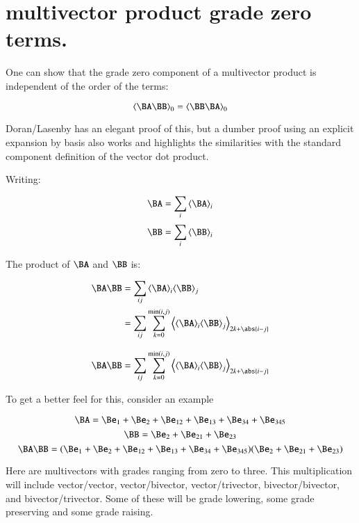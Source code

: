 
\chapter{ multivector product grade zero terms. }

One can show that the grade zero component of a multivector product 
is independent of the order of the terms:

\begin{equation}
\gpgradezero{\BA \BB} = \gpgradezero{\BB \BA}
\end{equation}

Doran/Lasenby has an elegant proof of this, but a dumber proof using an
explicit expansion by basis also works and highlights the similarities
with the standard component definition of the vector dot product.

Writing:

\[
\BA = \sum_i \gpgrade{\BA}{i}
\]
\[
\BB = \sum_i \gpgrade{\BB}{i}
\]

The product of $\BA$ and $\BB$ is:

\begin{align*}
\BA \BB 
&= \sum_{ij} \gpgrade{\BA}{i} \gpgrade{\BB}{j} \\
&= \sum_{ij} \sum_{k=0}^{\min(i,j)}\gpgrade{\gpgrade{\BA}{i} \gpgrade{\BB}{j}}{2k + \abs{i-j}} \\
\end{align*}

\begin{equation}\label{eqn:scalar_commutes:product}
\BA \BB 
= \sum_{ij} \sum_{k=0}^{\min(i,j)}\gpgrade{\gpgrade{\BA}{i} \gpgrade{\BB}{j}}{2k + \abs{i-j}} 
\end{equation}

To get a better feel for this, consider an example

\[
\BA = \Be_1 + \Be_2 + \Be_{12} + \Be_{13} + \Be_{34} + \Be_{345}
\]
\[
\BB = \Be_2 + \Be_{21} + \Be_{23}
\]
\[
\BA \BB = ( \Be_1 + \Be_2 + \Be_{12} + \Be_{13} + \Be_{34} + \Be_{345})(\Be_2 + \Be_{21} + \Be_{23})
\]

Here are multivectors with grades ranging from zero to three.  This multiplication will include vector/vector, vector/bivector, vector/trivector, bivector/bivector, and bivector/trivector.  Some of these will be grade lowering, some grade preserving and some grade raising.

